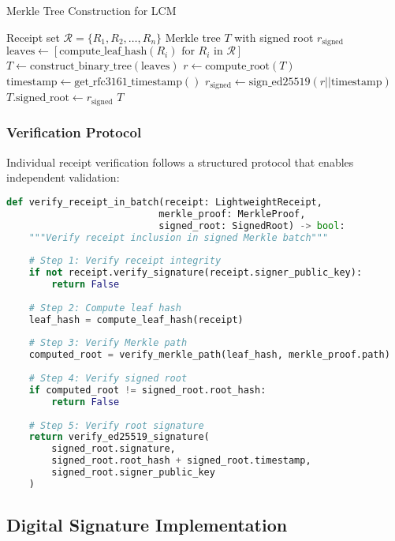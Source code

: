 \documentclass[12pt,a4paper]{article}
\begin{document}
\begin{algorithm}[H]
\caption{Merkle Tree Construction for LCM}
\begin{algorithmic}[1]
\REQUIRE Receipt set $\mathcal{R} = \{R_1, R_2, \ldots, R_n\}$
\ENSURE Merkle tree $T$ with signed root $r_{\text{signed}}$
\STATE $\text{leaves} \leftarrow [\text{compute\_leaf\_hash}(R_i) \text{ for } R_i \text{ in } \mathcal{R}]$
\STATE $T \leftarrow \text{construct\_binary\_tree}(\text{leaves})$
\STATE $r \leftarrow \text{compute\_root}(T)$
\STATE $\text{timestamp} \leftarrow \text{get\_rfc3161\_timestamp}()$
\STATE $r_{\text{signed}} \leftarrow \text{sign\_ed25519}(r || \text{timestamp})$
\STATE $T.\text{signed\_root} \leftarrow r_{\text{signed}}$
\RETURN $T$
\end{algorithmic}
\end{algorithm}

\subsubsection{Verification Protocol}

Individual receipt verification follows a structured protocol that enables independent validation:

\begin{lstlisting}[language=Python, caption=Merkle Verification Protocol]
def verify_receipt_in_batch(receipt: LightweightReceipt, 
                           merkle_proof: MerkleProof,
                           signed_root: SignedRoot) -> bool:
    """Verify receipt inclusion in signed Merkle batch"""
    
    # Step 1: Verify receipt integrity
    if not receipt.verify_signature(receipt.signer_public_key):
        return False
    
    # Step 2: Compute leaf hash
    leaf_hash = compute_leaf_hash(receipt)
    
    # Step 3: Verify Merkle path
    computed_root = verify_merkle_path(leaf_hash, merkle_proof.path)
    
    # Step 4: Verify signed root
    if computed_root != signed_root.root_hash:
        return False
        
    # Step 5: Verify root signature
    return verify_ed25519_signature(
        signed_root.signature,
        signed_root.root_hash + signed_root.timestamp,
        signed_root.signer_public_key
    )
\end{lstlisting}

\subsection{Digital Signature Implementation}
\end{document}
